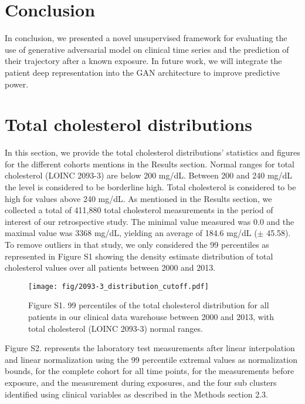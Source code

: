 \documentclass{article}
\begin{document}
\section{Conclusion}

In conclusion, we presented a novel unsupervised framework for evaluating the use of generative adversarial model on clinical time series and the prediction of their trajectory after a known exposure. In future work, we will integrate the patient deep representation into the GAN architecture to improve predictive power. 



 

\appendix

\section{Total cholesterol distributions}
In this section, we provide the total cholesterol distributions' statistics and figures for the different cohorts mentions in the Results section. Normal ranges for total cholesterol (LOINC 2093-3) are below 200 mg/dL. Between 200 and 240 mg/dL the level is considered to be borderline high. Total cholesterol is considered to be high for values above 240 mg/dL. As mentioned in the Results section, we collected a total of 411,880 total cholesterol measurements in the period of interest of our retrospective study. The minimal value measured was 0.0 and the maximal value was 3368 mg/dL, yielding an average of 184.6 mg/dL ($\pm$ 45.58). To remove outliers in that study, we only considered the 99 percentiles as represented in Figure S1 showing the density estimate distribution of total cholesterol values over all patients between 2000 and 2013.

\begin{figure}[h]
	\centering
	\texttt{[image: fig/2093-3\_distribution\_cutoff.pdf]}
	\caption*{Figure S1. 99 percentiles of the total cholesterol distribution for all patients in our clinical data warehouse between 2000 and 2013, with total cholesterol (LOINC 2093-3) normal ranges.}
	\vspace*{-1em}
\end{figure}

Figure S2. represents the laboratory test measurements after linear interpolation and linear normalization using the 99 percentile extremal values as normalization bounds, for the complete cohort for all time points, for the measurements before exposure, and the measurement during exposures, and the four sub clusters identified using clinical variables as described in the Methods section 2.3.
\end{document}
